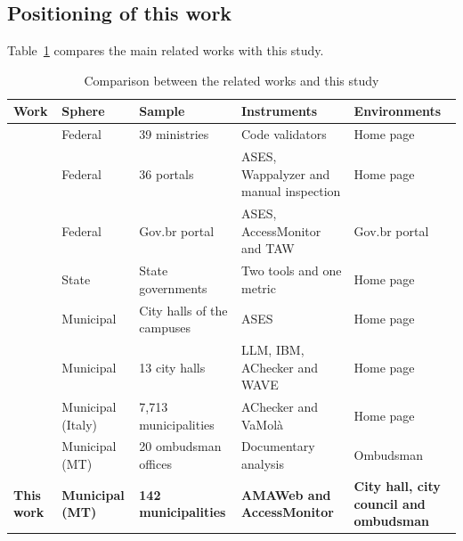 \documentclass[12pt]{article}
\begin{document}
\subsection{Positioning of this work}

Table~\ref{tab:relacionados} compares the main related works with this study.

\begin{table}[ht]
\centering
\caption{Comparison between the related works and this study}
\label{tab:relacionados}
\footnotesize
\setlength{\tabcolsep}{3pt}
\begin{tabular}{lp{1.9cm}p{2.5cm}p{3.1cm}p{2.5cm}}
\toprule
\textbf{Work} & \raggedright\textbf{Sphere} & \raggedright\textbf{Sample} & \raggedright\textbf{Instruments} & \raggedright\textbf{Environments}\tabularnewline
\midrule
\cite{sbsi}                    & \raggedright Federal            & \raggedright 39 ministries           & \raggedright Code validators                   & \raggedright Home page\tabularnewline
\cite{10.1145/3658271.3658276} & \raggedright Federal            & \raggedright 36 portals              & \raggedright ASES, Wappalyzer and manual inspection & \raggedright Home page\tabularnewline
\cite{barros2024}              & \raggedright Federal            & \raggedright Gov.br portal           & \raggedright ASES, AccessMonitor and TAW       & \raggedright Gov.br portal\tabularnewline
\cite{carvalho2017}            & \raggedright State              & \raggedright State governments       & \raggedright Two tools and one metric          & \raggedright Home page\tabularnewline
\cite{eres}                    & \raggedright Municipal          & \raggedright City halls of the campuses & \raggedright ASES                           & \raggedright Home page\tabularnewline
\cite{franca2025}              & \raggedright Municipal          & \raggedright 13 city halls           & \raggedright LLM, IBM, AChecker and WAVE       & \raggedright Home page\tabularnewline
\cite{valtolina2022}           & \raggedright Municipal (Italy)  & \raggedright 7,713 municipalities    & \raggedright AChecker and VaMolà               & \raggedright Home page\tabularnewline
\cite{zahn2023}                & \raggedright Municipal (MT)     & \raggedright 20 ombudsman offices    & \raggedright Documentary analysis              & \raggedright Ombudsman\tabularnewline
\textbf{This work}             & \raggedright\textbf{Municipal (MT)} & \raggedright\textbf{142 municipalities} & \raggedright\textbf{AMAWeb and AccessMonitor} & \raggedright\textbf{City hall, city council and ombudsman}\tabularnewline
\bottomrule
\end{tabular}
\end{table}
\end{document}
